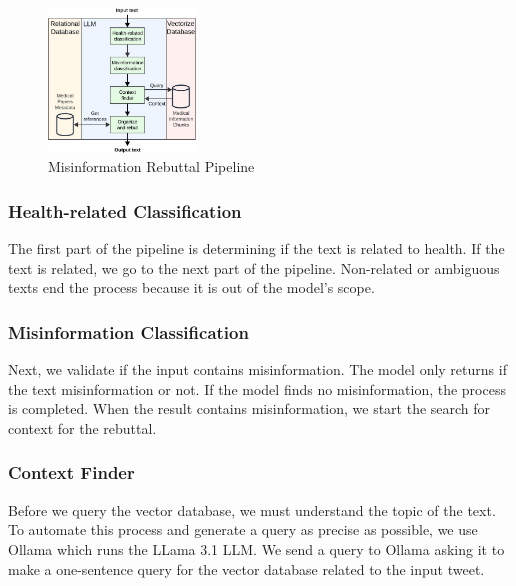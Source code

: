 \begin{figure}[htbp]
	\begin{center}
		\includegraphics[width=0.35\textwidth]{figures/LLM_Pipeline.jpeg} %
	\end{center}
	\caption{Misinformation Rebuttal Pipeline} %
	\label{fig:llm}
\end{figure}


\subsubsection{Health-related Classification}
The first part of the pipeline is determining if the text is related to health. If the text is related, we go to the next part of the pipeline. Non-related or ambiguous texts end the process because it is out of the model's scope. 

\subsubsection{Misinformation Classification}
Next, we validate if the input contains misinformation. The model  only returns if the text misinformation or not. If the model finds no misinformation, the process is completed. When the result contains misinformation, we start the search for context for the rebuttal.

\subsubsection{Context Finder}
Before we  query the vector database, we must understand the topic of the text. To automate this process and generate a query as precise as possible, we use Ollama \cite{ollama} which runs the LLama 3.1 LLM. We send a query to Ollama asking it to make a one-sentence query for the vector database related to the input tweet.

